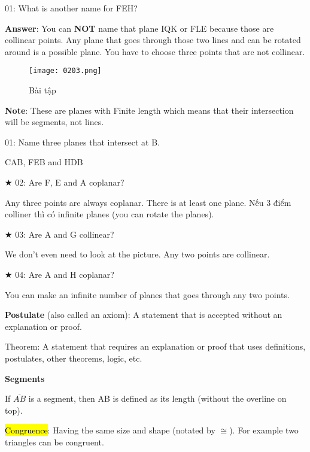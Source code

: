 01: What is another name for FEH?

\textbf{Answer}: You can \textbf{NOT} name that plane IQK or FLE because those are collinear points. Any plane that goes through those two lines and can be rotated around is a possible plane. You have to choose three points that are not collinear.

\newpage

\begin{figure}[h!]
  \centering
  \texttt{[image: 0203.png]}
  \caption{Bài tập}
\end{figure}

\textbf{Note}: These are planes with Finite length which means that their intersection will be segments, not lines.

01: Name three planes that intersect at B.

CAB, FEB and HDB

$\bigstar$ 02: Are F, E and A coplanar?

Any three points are always coplanar. There is at least one plane. Nếu 3 điểm colliner thì có infinite planes (you can rotate the planes).

$\bigstar$ 03: Are A and G collinear?

We don't even need to look at the picture. Any two points are collinear.

$\bigstar$ 04: Are A and H coplanar?

You can make an infinite number of planes that goes through any two points.

\par\noindent\dotfill

\textbf{Postulate} (also called an axiom): A statement that is accepted without an explanation or proof.

Theorem: A statement that requires an explanation or proof that uses definitions, postulates, other theorems, logic, etc.

\vspace{1 cm}

\centerline{\textbf{\huge Segments}}

\vspace{0.2 cm}

If $\overline{AB}$ is a segment, then AB is defined as its length (without the overline on top).

\hl{Congruence}: Having the same size and shape (notated by $\cong$). For example two triangles can be congruent.


